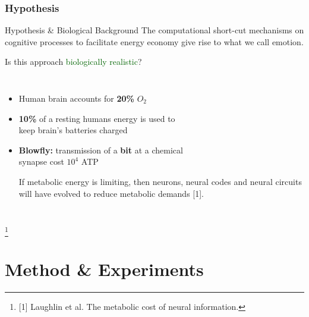 \documentclass{beamer}
\begin{document}
\begin{frame}
\frametitle{Hypothesis}
\begin{block}{Hypothesis \& Biological Background}
The computational short-cut mechanisms on cognitive processes to facilitate 
energy economy give rise to what we call emotion.
\end{block}
Is this approach \textcolor{darkgreen}{biologically realistic}?
\begin{columns}[l|c]
  \column{2.9in}  %

\begin{itemize}\scriptsize
\item Human brain accounts for \textbf{20\%} $O_{2}$
\item \textbf{10\%} of a resting humans energy is used to \\keep brain's batteries charged
\item \textbf{Blowfly:} transmission of a \textbf{bit} at a chemical\\ synapse cost $10^{4}$ ATP
\begin{block}{}\scriptsize
If metabolic energy is limiting, then neurons, neural codes and neural circuits will have evolved to reduce metabolic demands [1].

\end{block}
\end{itemize}
  		
  		
\column{1.8in}

\end{columns}
\footnote{\tiny [1] Laughlin et al. The metabolic cost of neural information. }
 
\end{frame}



\section{Method \& Experiments}
\end{document}
